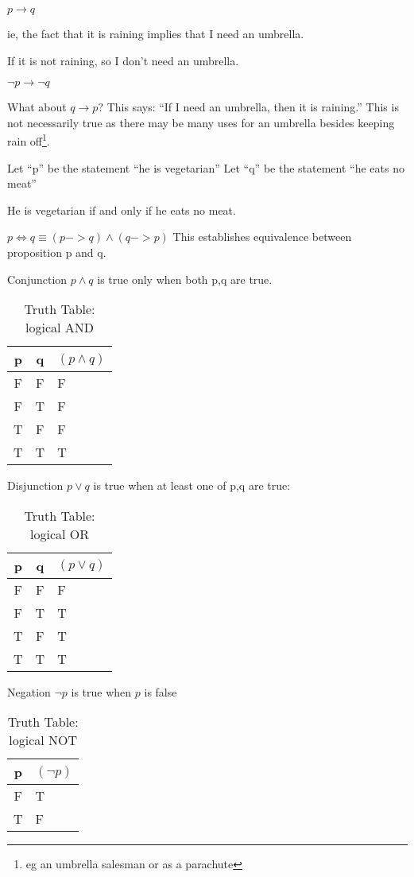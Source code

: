 $ p \to q $

ie, the fact that it is raining implies that I need an umbrella.

If it is not raining, so I don't need an umbrella.

$ \lnot p \to \lnot q $

What about $q \to p$?
This says: ``If I need an umbrella, then it is raining.'' This is not
necessarily true as there may be many uses for an umbrella besides keeping rain
off\footnote{eg an umbrella salesman or as a parachute}.

Let ``p'' be the statement ``he is vegetarian''
Let ``q'' be the statement ``he eats no meat''

He is vegetarian if and only if he eats no meat.

$ p \iff q \equiv (p -> q) \land (q -> p)$
This establishes equivalence between proposition p and q.


Conjunction $p \land q$ is true only when both p,q are true.
\begin{table}[!htb]
\label{tab:TruthTableAND}
\begin{tabularx}{\linewidth}{| c | c | X |} \hline
  p & q & $(p \land q)$ \\ \hline \hline
  F & F & F \\ \hline
  F & T & F \\ \hline
  T & F & F \\ \hline
  T & T & T \\ \hline
\end{tabularx}
\caption{Truth Table: logical AND}
\end{table}

Disjunction $p \lor q$ is true when at least one of p,q are true:
\begin{table}[!htb]
\label{tab:TruthTableOR}
\begin{tabularx}{\linewidth}{| c | c | X |} \hline
  p & q & $(p \lor q)$ \\ \hline \hline
  F & F & F \\ \hline
  F & T & T \\ \hline
  T & F & T \\ \hline
  T & T & T \\ \hline
\end{tabularx}
\caption{Truth Table: logical OR}
\end{table}

Negation $\lnot p$ is true when $p$ is false
\begin{table}[!htb]
\label{tab:TruthTableNOT}
\begin{tabularx}{\linewidth}{| c | X |} \hline
  p & $(\lnot p)$ \\ \hline \hline
  F & T \\ \hline
  T & F\\ \hline
\end{tabularx}
\caption{Truth Table: logical NOT}
\end{table}

